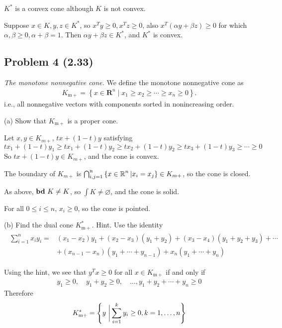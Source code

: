 \documentclass[en,hazy,blue,12pt,device = pad]{elegantnote}
\begin{document}
\begin{center}
    \(K^*\) is a convex cone although \(K\) is not convex.
\end{center}
\begin{tcolorbox}
    \pf

    Suppose \(x \in K,y,z \in K^*\), so \(x^Ty\geq 0 , x^T z \geq 0\), also \(x^T(\alpha y + \beta z) \geq 0\) for which \(\alpha, \beta \geq 0, \alpha + \beta = 1\). Then \(\alpha y + \beta z \in K^*\), and \(K^*\) is convex.
\end{tcolorbox}

\subsection*{Problem 4 (2.33)}
\textit{The monotone nonnegative cone.} We define the monotone nonnegative cone as
\begin{align*}
K_{\mathrm{m}+}=\left\{x \in \mathbf{R}^n \mid x_1 \geq x_2 \geq \cdots \geq x_n \geq 0\right\} .
\end{align*}
i.e., all nonnegative vectors with components sorted in nonincreasing order.

(a) Show that \(K_{\mathrm{m+}}\) is a proper cone.
\begin{tcolorbox}
    \sol

    Let \(x,y \in K_{m+}\), \(tx + (1-t )y\) satisfying
    \[tx_1 + (1-t)y_1 \geq tx_1 + (1-t)y_2 \geq tx_2 + (1-t)y_2 \geq tx_3 + (1-t)y_3 \geq \cdots \geq 0\]
    So \(tx + (1-t)y \in K_{m+}\), and the cone is convex.

    The boundary of \(K_{m+}\) is \(\bigcap _{i,j = 1}^n \left\{x \in \operatorname{\mathbb R}^n | x_i = x_j \right\} \in K_{m+}\), so the cone is closed.

    As above, \({\textbf{bd}\ } K \neq K\), so \(\int K \neq \varnothing\), and the cone is solid.

    For all \(0\leq i\leq n\), \(x_i \geq 0\), so the cone is pointed.
\end{tcolorbox}
(b) Find the dual cone \(K_{\mathrm{m}+}^*\). Hint. Use the identity
\begin{align*}
\begin{aligned}
\sum_{i=1}^n x_i y_i= & \left(x_1-x_2\right) y_1+\left(x_2-x_3\right)\left(y_1+y_2\right)+\left(x_3-x_4\right)\left(y_1+y_2+y_3\right)+\cdots \\
& +\left(x_{n-1}-x_n\right)\left(y_1+\cdots+y_{n-1}\right)+x_n\left(y_1+\cdots+y_n\right)
\end{aligned}
\end{align*}
\begin{tcolorbox}
    \sol

    Using the hint, we see that \(y^T x \geq 0\) for all \(x \in K_{\mathrm{m}+}\) if and only if
    \begin{align*}
    y_1 \geq 0, \quad y_1+y_2 \geq 0, \quad \ldots, y_1+y_2+\cdots+y_n \geq 0
    \end{align*}
    Therefore
    \begin{align*}
    K_{\mathrm{m}+}^*=\left\{y\ \bigg{|} \sum_{i=1}^k y_i \geq 0, k=1, \ldots, n\right\}
    \end{align*}
\end{tcolorbox}
\end{document}
